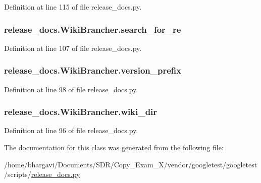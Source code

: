 Definition at line 115 of file release\+\_\+docs.\+py.

\subsubsection[{\texorpdfstring{search\+\_\+for\+\_\+re}{search_for_re}}]{\setlength{\rightskip}{0pt plus 5cm}release\+\_\+docs.\+Wiki\+Brancher.\+search\+\_\+for\+\_\+re}\hypertarget{classrelease__docs_1_1_wiki_brancher_a029ce9007fefd6ac5f13bacdedb29af5}{}\label{classrelease__docs_1_1_wiki_brancher_a029ce9007fefd6ac5f13bacdedb29af5}


Definition at line 107 of file release\+\_\+docs.\+py.

\subsubsection[{\texorpdfstring{version\+\_\+prefix}{version_prefix}}]{\setlength{\rightskip}{0pt plus 5cm}release\+\_\+docs.\+Wiki\+Brancher.\+version\+\_\+prefix}\hypertarget{classrelease__docs_1_1_wiki_brancher_aae330aeef850b105795c5d75727448ba}{}\label{classrelease__docs_1_1_wiki_brancher_aae330aeef850b105795c5d75727448ba}


Definition at line 98 of file release\+\_\+docs.\+py.

\subsubsection[{\texorpdfstring{wiki\+\_\+dir}{wiki_dir}}]{\setlength{\rightskip}{0pt plus 5cm}release\+\_\+docs.\+Wiki\+Brancher.\+wiki\+\_\+dir}\hypertarget{classrelease__docs_1_1_wiki_brancher_ad86478c9538ac0bf3916f67eb5da2910}{}\label{classrelease__docs_1_1_wiki_brancher_ad86478c9538ac0bf3916f67eb5da2910}


Definition at line 96 of file release\+\_\+docs.\+py.



The documentation for this class was generated from the following file\+:\begin{DoxyCompactItemize}
\item 
/home/bhargavi/\+Documents/\+S\+D\+R/\+Copy\+\_\+\+Exam\+\_\+X/vendor/googletest/googletest/scripts/\hyperlink{release__docs_8py}{release\+\_\+docs.\+py}\end{DoxyCompactItemize}
